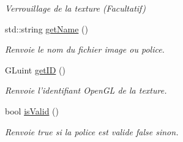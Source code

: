 \begin{DoxyCompactItemize}
\begin{DoxyCompactList}\small\item\em Verrouillage de la texture (Facultatif) \end{DoxyCompactList}\item 
\hypertarget{classTexture_a29d25e904c47cc08b5420c0cd5474743}{std\+::string \hyperlink{classTexture_a29d25e904c47cc08b5420c0cd5474743}{get\+Name} ()}\label{classTexture_a29d25e904c47cc08b5420c0cd5474743}

\begin{DoxyCompactList}\small\item\em Renvoie le nom du fichier image ou police. \end{DoxyCompactList}\item 
\hypertarget{classTexture_aab4bc3a5783b23881209c15223f2621e}{G\+Luint \hyperlink{classTexture_aab4bc3a5783b23881209c15223f2621e}{get\+I\+D} ()}\label{classTexture_aab4bc3a5783b23881209c15223f2621e}

\begin{DoxyCompactList}\small\item\em Renvoie l'identifiant Open\+G\+L de la texture. \end{DoxyCompactList}\item 
\hypertarget{classTexture_ac6f04a129a2c8ac1e22c7990866849db}{bool \hyperlink{classTexture_ac6f04a129a2c8ac1e22c7990866849db}{is\+Valid} ()}\label{classTexture_ac6f04a129a2c8ac1e22c7990866849db}

\begin{DoxyCompactList}\small\item\em Renvoie true si la police est valide false sinon. \end{DoxyCompactList}\end{DoxyCompactItemize}
